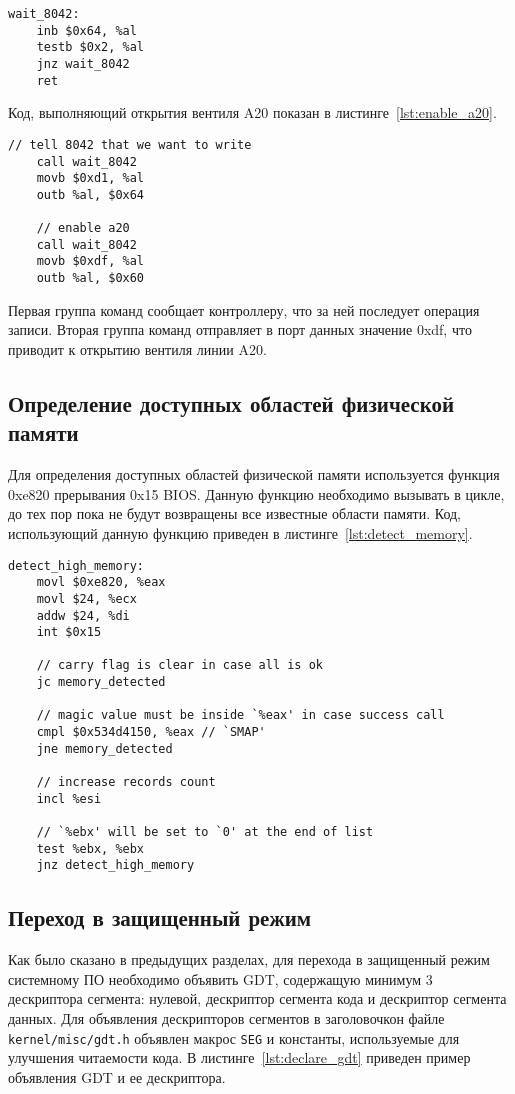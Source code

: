 \begin{lstlisting}[language={[x86masm]Assembler},
caption={Ожидание готовности контроллера 8042},label={lst:wait_8042}]
wait_8042:
	inb $0x64, %al
	testb $0x2, %al
	jnz wait_8042
	ret
\end{lstlisting}

Код, выполняющий открытия вентиля A20 показан в листинге~\ref{lst:enable_a20}.

\begin{lstlisting}[language={[x86masm]Assembler},
caption={Открытие вентиля линии A20},label={lst:enable_a20}]
	// tell 8042 that we want to write
	call wait_8042
	movb $0xd1, %al
	outb %al, $0x64

	// enable a20
	call wait_8042
	movb $0xdf, %al
	outb %al, $0x60
\end{lstlisting}

Первая группа команд сообщает контроллеру, что за ней последует операция записи.
Вторая группа команд отправляет в порт данных значение 0xdf, что приводит к открытию
вентиля линии A20.

\subsection{Определение доступных областей физической памяти}
Для определения доступных областей физической памяти используется функция 0xe820 прерывания 0x15 BIOS.
Данную функцию необходимо вызывать в цикле, до тех пор пока не будут возвращены все известные области
памяти. Код, использующий данную функцию приведен в листинге~\ref{lst:detect_memory}.

\begin{lstlisting}[language={[x86masm]Assembler},
caption={Определение доступных областей физической памяти},label={lst:detect_memory}]
detect_high_memory:
	movl $0xe820, %eax
	movl $24, %ecx
	addw $24, %di
	int $0x15

	// carry flag is clear in case all is ok
	jc memory_detected

	// magic value must be inside `%eax' in case success call
	cmpl $0x534d4150, %eax // `SMAP'
	jne memory_detected

	// increase records count
	incl %esi

	// `%ebx' will be set to `0' at the end of list
	test %ebx, %ebx
	jnz detect_high_memory
\end{lstlisting}


\subsection{Переход в защищенный режим}
Как было сказано в предыдущих разделах, для перехода в защищенный режим системному ПО
необходимо объявить GDT, содержащую минимум 3 дескриптора сегмента: нулевой, дескриптор сегмента
кода и дескриптор сегмента данных. Для объявления дескрипторов сегментов в заголовочкон файле
\texttt{kernel/misc/gdt.h} объявлен макрос \texttt{SEG} и константы, используемые для улучшения
читаемости кода. В листинге~\ref{lst:declare_gdt} приведен пример объявления GDT и ее дескриптора.

